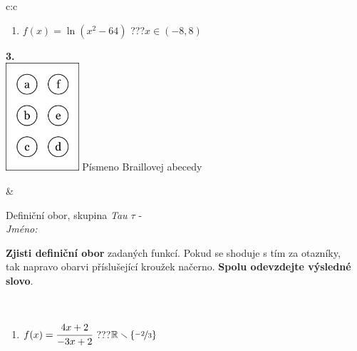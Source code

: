 \documentclass[10pt]{report}
\begin{document}
\begin{tabular}{c:c}
\begin{minipage}[c][104.5mm][t]{0.5\linewidth}
\begin{center}
\begin{minipage}{0.79\linewidth}
\begin{center}
\begin{varwidth}{\linewidth}
\begin{enumerate}
\item $f(x)=\ln{(x^2-64)}$\quad \dotfill\; ???\;\dotfill \quad $x\in(-8 , 8)$
\end{enumerate}
\end{varwidth}
\end{center}
\end{minipage}
\begin{minipage}{0.20\linewidth}
\begin{center}
{\Huge\bfseries 3.} \\[2mm]
\includegraphics[height=40mm]{../images/braille.png}
{\small Písmeno Braillovej abecedy}
\end{center}
\end{minipage}
\end{center}
\end{minipage}
&
\begin{minipage}[c][104.5mm][t]{0.5\linewidth}
\begin{center}
\vspace{7mm}
{\huge Definiční obor, skupina \textit{Tau $\tau$} -}\\[5mm]
\textit{Jméno:}\phantom{xxxxxxxxxxxxxxxxxxxxxxxxxxxxxxxxxxxxxxxxxxxxxxxxxxxxxxxxxxxxxxxxx}\\[5mm]
\begin{minipage}{0.95\linewidth}
\begin{center}
\textbf{Zjisti definiční obor} zadaných funkcí. Pokud se shoduje s tím za otazníky,\\tak napravo obarvi příslušející kroužek načerno. \textbf{Spolu odevzdejte výsledné slovo}.
\end{center}
\end{minipage}
\\[1mm]
\begin{minipage}{0.79\linewidth}
\begin{center}
\begin{varwidth}{\linewidth}
\begin{enumerate}
\normalsizerrr
\item $f(x)=\cfrac{4x+2}{-3x+2}$\quad \dotfill\; ???\;\dotfill \quad $\mathbb{R}\smallsetminus\{\nicefrac{-2}{3}\}$

\end{enumerate}
\end{varwidth}
\end{center}
\end{minipage}
\end{center}
\end{minipage}
\end{tabular}
\end{document}
